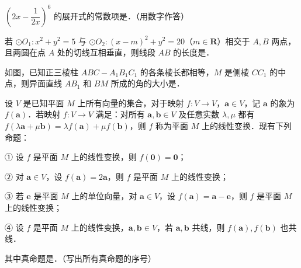 \begin{question}
$\left(2x-\dfrac1{2x}\right)^6$ 的展开式的常数项是\gkblank{}．（用数字作答）

\end{question}
\begin{question}
若 $\odot O_1:x^2+y^2=5$ 与 $\odot O_2:(x-m)^2+y^2=20$（$m\in\mathbf R$）相交于 $A,B$ 两点，且两圆在点 $A$ 处的切线互相垂直，则线段 $AB$ 的长度是\gkblank{}．

\Needspace{0.4\textheight}
\end{question}
\begin{question}
如图，已知正三棱柱 $ABC-A_1B_1C_1$ 的各条棱长都相等，$M$ 是侧棱 $CC_1$ 的中点，则异面直线 $AB_1$ 和 $BM$ 所成的角的大小是\gkblank{}．
\nopagebreak[4]
\begin{center}\end{center}
\nopagebreak[4]
\end{question}
\begin{question}
设 $V$ 是已知平面 $M$ 上所有向量的集合，对于映射 $f:V\to V$，$\boldsymbol a\in V$，记 $\boldsymbol a$ 的象为 $f(\boldsymbol a)$．若映射 $f:V\to V$ 满足：对所有 $\boldsymbol a,\boldsymbol b\in V$ 及任意实数 $\lambda,\mu$ 都有 $f(\lambda\boldsymbol a+\mu\boldsymbol b)=\lambda f(\boldsymbol a)+\mu f(\boldsymbol b)$，则 $f$ 称为平面 $M$ 上的线性变换．现有下列命题：

① 设 $f$ 是平面 $M$ 上的线性变换，则 $f(\boldsymbol 0)=\boldsymbol 0$；

② 对 $\boldsymbol a\in V$，设 $f(\boldsymbol a)=2\boldsymbol a$，则 $f$ 是平面 $M$ 上的线性变换；

③ 若 $\boldsymbol e$ 是平面 $M$ 上的单位向量，对 $\boldsymbol a\in V$，设 $f(\boldsymbol a)=\boldsymbol a-\boldsymbol e$，则 $f$ 是平面 $M$ 上的线性变换；

④ 设 $f$ 是平面 $M$ 上的线性变换，$\boldsymbol a,\boldsymbol b\in V$，若 $\boldsymbol a,\boldsymbol b$ 共线，则 $f(\boldsymbol a),f(\boldsymbol b)$ 也共线．

其中真命题是\gkblank{}．（写出所有真命题的序号）

\end{question}

